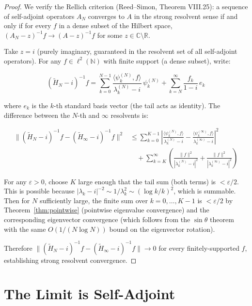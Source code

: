 \documentclass[11pt,a4paper]{article}
\begin{document}
\begin{proof}
We verify the Rellich criterion (Reed--Simon, Theorem VIII.25):
a sequence of self-adjoint operators $A_N$ converges to $A$ in the
strong resolvent sense if and only if for every $f$ in a dense subset
of the Hilbert space, $(A_N - z)^{-1}f \to (A - z)^{-1}f$ for some
$z \in \mathbb{C}\setminus\mathbb{R}$.

Take $z = i$ (purely imaginary, guaranteed in the resolvent set of
all self-adjoint operators). For any $f \in \ell^2(\mathbb{N})$ with
finite support (a dense subset), write:

\begin{equation}\label{eq:resolvent}
(\widetilde{H}_N - i)^{-1} f =
\sum_{k=0}^{N-1} \frac{\langle \psi_k^{(N)}, f\rangle}
{\lambda_k^{(N)} - i}\,\psi_k^{(N)} +
\sum_{k=N}^{\infty} \frac{f_k}{1 - i}\,e_k
\end{equation}

where $e_k$ is the $k$-th standard basis vector (the tail acts as
identity). The difference between the $N$-th and $\infty$ resolvents is:

\begin{align*}
\|(\widetilde{H}_N - i)^{-1}f - (\widetilde{H}_\infty - i)^{-1}f\|^2
&\leq \sum_{k=0}^{K-1}
\left|\frac{\langle\psi_k^{(N)},f\rangle}{\lambda_k^{(N)}-i} -
\frac{\langle\psi_k^{(\infty)},f\rangle}{\lambda_k^{(\infty)}-i}\right|^2 \\
&\quad + \sum_{k=K}^{\infty}
\left(\frac{\|f\|^2}{|\lambda_k^{(N)}-i|^2} +
\frac{\|f\|^2}{|\lambda_k^{(\infty)}-i|^2}\right)
\end{align*}

For any $\varepsilon > 0$, choose $K$ large enough that the tail sum
(both terms) is $< \varepsilon/2$. This is possible because
$|\lambda_k - i|^{-2} \sim 1/\lambda_k^2 \sim (\log k/k)^2$, which is
summable. Then for $N$ sufficiently large, the finite sum over
$k = 0,\ldots,K-1$ is $< \varepsilon/2$ by Theorem~\ref{thm:pointwise}
(pointwise eigenvalue convergence) and the corresponding eigenvector
convergence (which follows from the $\sin\theta$ theorem with the same
$O(1/(N\log N))$ bound on the eigenvector rotation).

Therefore $\|(\widetilde{H}_N - i)^{-1}f - (\widetilde{H}_\infty -
i)^{-1}f\| \to 0$ for every finitely-supported $f$, establishing
strong resolvent convergence.
\end{proof}

\section{The Limit is Self-Adjoint}
\end{document}
